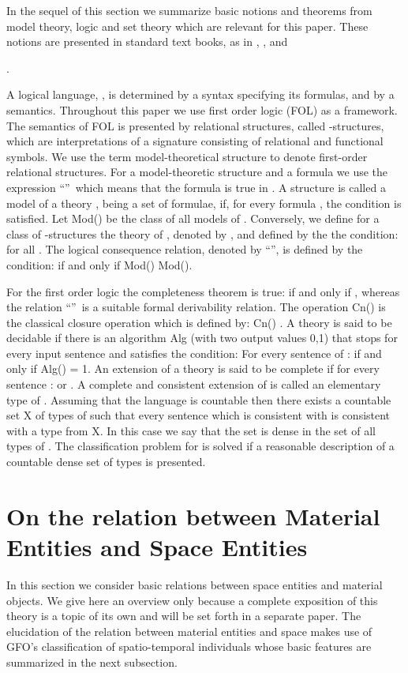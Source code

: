 \documentclass{ao2e}
\begin{document}
In the sequel of this section we summarize basic notions and theorems from model theory, logic and set theory which are relevant for this paper. These notions are presented in standard text books, as in
\cite{hodges-w-1993-a}, \cite{chang-cc-1977-a}, \cite{barwise-j-1985-a} and {\cite{devlin-k-1993-a}.

A logical language, , is determined by a syntax specifying its formulas, and by a semantics. Throughout this paper we use first order logic (FOL) as a framework.  The semantics of FOL is presented by relational structures, called -structures, which are interpretations of a signature  consisting of relational and functional symbols. We use the term model-theoretical structure to denote first-order relational structures. For a model-theoretic structure  and a formula  we use the expression ``''\ which means that the formula  is true in . A structure  is called a model of a theory , being a set of formulae, if, for every formula , the condition  is satisfied. Let Mod() be the class of all models of . Conversely, we define for a class  of -structures the theory of
, denoted by , and defined by the the condition: 
 for all .
The logical consequence relation, denoted by ``'', is defined by the condition:  if and only if Mod() Mod().

\hspace*{0.5cm}For the first order logic the completeness theorem is true:  if and only if , whereas the relation ``''\ is a suitable formal derivability relation. The operation Cn() is the classical closure operation which is defined by: Cn()  . A theory  is said to be decidable if there is an algorithm Alg (with two output values 0,1) that stops for every input sentence and satisfies the condition: For every sentence  of :  if and only if Alg() = 1.
    An extension  of a theory  is said to be complete if for every sentence :   or . A complete and consistent extension of  is called an elementary type of . Assuming that the language  is countable then there exists a countable set X of types of  such that every sentence  which is consistent with  is consistent with a type from X. In this case we say that the set  is dense in the set of all types of .  The classification problem for  is solved if a reasonable description of a countable dense set of types is presented.


\section{On the relation between Material Entities and Space Entities}
In this section we consider basic relations between space entities and material objects. We give here
an overview only because a complete exposition of this theory is a topic of its own and will be set forth in a separate paper. 
The elucidation of the relation between material entities and space makes use of GFO's classification of spatio-temporal individuals whose basic features are summarized in the next subsection.

}
\end{document}
